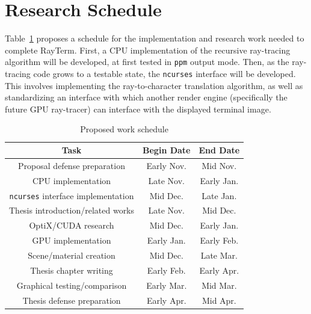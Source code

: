 \documentclass[11pt]{article}
\newcommand{\name}{{\sc RayTerm}}
\begin{document}
\section{Research Schedule}
\label{sec:schedule}


Table~\ref{worktable} proposes a schedule for the implementation and research work needed to complete \name.
First, a CPU implementation of the recursive ray-tracing algorithm will be developed, at first tested in \texttt{ppm} output mode.
Then, as the ray-tracing code grows to a testable state, the \texttt{ncurses} interface will be developed.
This involves implementing the ray-to-character translation algorithm, as well as standardizing an interface with which another render engine (specifically the future GPU ray-tracer) can interface with the displayed terminal image.

\begin{table}[htb]
  \vspace*{0.6em}
  \centering
  \begin{tabular}{|c||c|c|}
    \hline
    \textbf{Task} & \textbf{Begin Date} & \textbf{End Date} \\\hline\hline
    Proposal defense preparation & Early Nov. & Mid Nov. \\\hline
    CPU implementation & Late Nov. & Early Jan. \\\hline
    \texttt{ncurses} interface implementation & Mid Dec. & Late Jan. \\\hline
    Thesis introduction/related works & Late Nov. & Mid Dec. \\\hline
    OptiX/CUDA research & Mid Dec. & Early Jan. \\\hline
    GPU implementation & Early Jan. & Early Feb. \\\hline
    Scene/material creation & Mid Dec. & Late Mar. \\\hline
    Thesis chapter writing & Early Feb. & Early Apr. \\\hline
    Graphical testing/comparison & Early Mar. & Mid Mar. \\\hline
    Thesis defense preparation & Early Apr. & Mid Apr. \\\hline
  \end{tabular}
  \caption{Proposed work schedule}
  \label{worktable}
\end{table}
\end{document}
